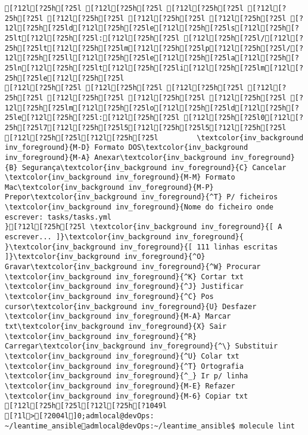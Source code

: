 \documentclass{scrartcl}
\begin{document}
\begin{Verbatim}
[?12l[?25h[?25l [?12l[?25h[?25l [?12l[?25h[?25l [?12l[?25h[?25l [?12l[?25h[?25l [?12l[?25h[?25l [?12l[?25h[?25l [?12l[?25h[?25ld[?12l[?25h[?25le[?12l[?25h[?25ls[?12l[?25h[?25lt[?12l[?25h[?25l:[?12l[?25h[?25l [?12l[?25h[?25l/[?12l[?25h[?25lt[?12l[?25h[?25lm[?12l[?25h[?25lp[?12l[?25h[?25l/[?12l[?25h[?25ll[?12l[?25h[?25le[?12l[?25h[?25la[?12l[?25h[?25ln[?12l[?25h[?25lt[?12l[?25h[?25li[?12l[?25h[?25lm[?12l[?25h[?25le[?12l[?25h[?25l
[?12l[?25h[?25l [?12l[?25h[?25l [?12l[?25h[?25l [?12l[?25h[?25l [?12l[?25h[?25l [?12l[?25h[?25l [?12l[?25h[?25l [?12l[?25h[?25lm[?12l[?25h[?25lo[?12l[?25h[?25ld[?12l[?25h[?25le[?12l[?25h[?25l:[?12l[?25h[?25l [?12l[?25h[?25l0[?12l[?25h[?25l7[?12l[?25h[?25l5[?12l[?25h[?25l5[?12l[?25h[?25l
[?12l[?25h[?25l[?12l[?25h[?25l         \textcolor{inv_background inv_foreground}{M-D} Formato DOS\textcolor{inv_background inv_foreground}{M-A} Anexar\textcolor{inv_background inv_foreground}{B} Segurança\textcolor{inv_background inv_foreground}{C} Cancelar           \textcolor{inv_background inv_foreground}{M-M} Formato Mac\textcolor{inv_background inv_foreground}{M-P} Prepor\textcolor{inv_background inv_foreground}{^T} P/ ficheiros
\textcolor{inv_background inv_foreground}{Nome do ficheiro onde escrever: tasks/tasks.yml                                                                                           }[?12l[?25h[?25l \textcolor{inv_background inv_foreground}{[ A escrever... ]}\textcolor{inv_background inv_foreground}{          }\textcolor{inv_background inv_foreground}{[ 111 linhas escritas ]}\textcolor{inv_background inv_foreground}{^O} Gravar\textcolor{inv_background inv_foreground}{^W} Procurar      \textcolor{inv_background inv_foreground}{^K} Cortar txt    \textcolor{inv_background inv_foreground}{^J} Justificar    \textcolor{inv_background inv_foreground}{^C} Pos cursor\textcolor{inv_background inv_foreground}{U} Desfazer     \textcolor{inv_background inv_foreground}{M-A} Marcar txt\textcolor{inv_background inv_foreground}{X} Sair    \textcolor{inv_background inv_foreground}{^R} Carregar\textcolor{inv_background inv_foreground}{^\} Substituir    \textcolor{inv_background inv_foreground}{^U} Colar txt     \textcolor{inv_background inv_foreground}{^T} Ortografia    \textcolor{inv_background inv_foreground}{^_} Ir p/ linha   \textcolor{inv_background inv_foreground}{M-E} Refazer      \textcolor{inv_background inv_foreground}{M-6} Copiar txt
[?12l[?25h[?25l[?12l[?25h[?1049l
[?1l>[?2004l]0;admlocal@devOps: ~/leantime_ansibleadmlocal@devOps:~/leantime_ansible$ molecule lint

\end{Verbatim}
\end{document}
